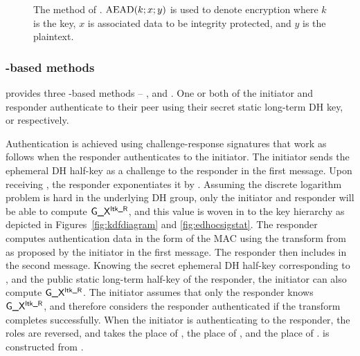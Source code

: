 \begin{figure}[!h]
{}
\caption{The \mPskPsk{} method of \mEdhoc. $\mbox{\textrm{AEAD}}(k; x; y)$ is used to denote
\mAead{} encryption where $k$ is the key, $x$ is associated data to be integrity
protected, and $y$ is the plaintext.}
\label{fig:edhocpsk}
\end{figure}
\spacehack
\subsubsection{\mStat-based methods}
\mEdhoc{} provides three \mStat-based methods -- \mSigStat{}, \mStatStat{} and \mStatSig{}. One or both of the initiator and responder authenticate to their peer using their secret static long-term DH key, \mLtki{} or \mLtkr{} respectively.
%

Authentication is achieved using challenge-response signatures that work as follows when the responder authenticates to the initiator.
%
The initiator sends the ephemeral DH half-key \mGx{} as a challenge to the responder in the first message.
%
%
Upon receiving \mGx{}, the responder exponentiates it by \mLtkr{}.
%
Assuming the discrete logarithm problem is hard in the underlying DH group, only the initiator and responder will be able to compute $\text{\textup{\textsf{G\_X}}}{}^{\text{\textup{\textsf{ltk\_R}}}}{}$, and this value is woven in to the key hierarchy as depicted in Figures~\ref{fig:kdfdiagram} and \ref{fig:edhocsigstat}.
%
The responder computes authentication data \mAuthr{} in the form of the MAC \mMactwo{} using the \mAead{} transform from \mSuites{} as proposed by the initiator in the first message.
%
The responder then includes \mMactwo{} in the second message.
%
Knowing the secret ephemeral DH half-key corresponding to \mGx{}, and the public static long-term half-key of the responder, the initiator can also compute $\text{\textup{\textsf{G\_X}}}{}^{\text{\textup{\textsf{ltk\_R}}}}{}$.
%
The initiator assumes that only the responder knows $\text{\textup{\textsf{G\_X}}}{}^{\text{\textup{\textsf{ltk\_R}}}}{}$, and therefore considers the responder authenticated if the \mAead{} transform completes successfully.
%
When the initiator is authenticating to the responder, the roles are reversed, and \mGy{} takes the place of \mGx{}, \mLtki{} the place of \mLtkr{}, and \mAuthi{} the place of \mAuthr{}. \mAuthi{} is constructed from \mMacthree{}.
%


